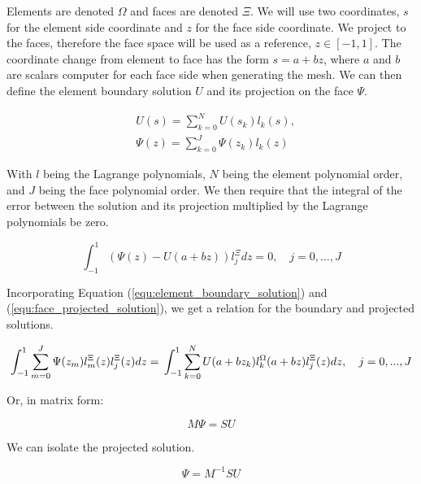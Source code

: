 Elements are denoted $\Omega$ and faces are denoted $\Xi$. We will use two coordinates, $s$ for the
element side coordinate and $z$ for the face side coordinate. We project to the faces, therefore the
face space will be used as a reference, $z \in [-1, 1]$. The coordinate change from element to face
has the form $s = a + bz$, where $a$ and $b$ are scalars computer for each face side when generating
the mesh. We can then define the element boundary solution $U$ and its projection on the face
$\Psi$. 

\begin{align} 
	& U(s) = \sum_{k = 0}^{N} U(s_k) l_k(s), \label{equ:element_boundary_solution} \\
	& \Psi (z) = \sum_{k = 0}^{J} \Psi(z_k) l_k(z) \label{equ:face_projected_solution}
\end{align}

With $l$ being the Lagrange polynomials, $N$ being the element polynomial order, and $J$ being the
face polynomial order. We then require that the integral of the error between the solution and its
projection multiplied by the Lagrange polynomials be zero. 

\begin{equation} \label{equ:zero_error}
	\int_{-1}^{1} \left ( \Psi (z) - U(a + bz) \right ) l_j^\Xi dz = 0, \quad j = 0, ...,J
\end{equation}

Incorporating Equation (\ref{equ:element_boundary_solution}) and (\ref{equ:face_projected_solution}),
we get a relation for the boundary and projected solutions.

\begin{equation} \label{equ:boundarry_and_projected}
	\int_{-1}^{1} \sum_{m = 0}^{J} \Psi (z_m) l_m^\Xi (z) l_j ^ \Xi(z) dz = \\
	\int_{-1}^{1} \sum_{k = 0}^{N} U(a + b z_k) l_k^\Omega (a + b z) l_j ^ \Xi (z) dz, \\ \quad
	j = 0, ..., J
\end{equation}

Or, in matrix form:

\begin{equation}
	M \Psi = S U
\end{equation}

We can isolate the projected solution.

\begin{equation}
	\Psi = M^{-1} S U
\end{equation}


